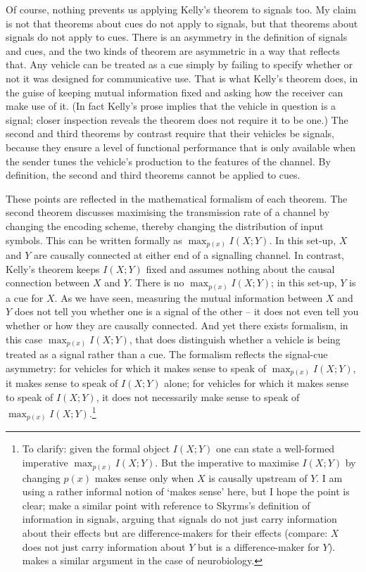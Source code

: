 \documentclass[12pt]{article}
\begin{document}
Of course, nothing prevents us applying Kelly's theorem to signals too.
My claim is not that theorems about cues do not apply to signals, but that theorems about signals do not apply to cues.
There is an asymmetry in the definition of signals and cues, and the two kinds of theorem are asymmetric in a way that reflects that.
Any vehicle can be treated as a cue simply by failing to specify whether or not it was designed for communicative use.
That is what Kelly's theorem does, in the guise of keeping mutual information fixed and asking how the receiver can make use of it.
(In fact Kelly's prose implies that the vehicle in question is a signal; closer inspection reveals the theorem does not require it to be one.)
The second and third theorems by contrast require that their vehicles be signals, because they ensure a level of functional performance that is only available when the sender tunes the vehicle's production to the features of the channel.
By definition, the second and third theorems cannot be applied to cues.

These points are reflected in the mathematical formalism of each theorem.
The second theorem discusses maximising the transmission rate of a channel by changing the encoding scheme, thereby changing the distribution of input symbols.
This can be written formally as $\max_{p(x)}I(X;Y)$.
In this set-up, $X$ and $Y$ are causally connected at either end of a signalling channel.
In contrast, Kelly's theorem keeps $I(X;Y)$ fixed and assumes nothing about the causal connection between $X$ and $Y$.
There is no $\max_{p(x)}I(X;Y)$; in this set-up, $Y$ is a cue for $X$.
As we have seen, measuring the mutual information between $X$ and $Y$ does not tell you whether one is a signal of the other -- it does not even tell you whether or how they are causally connected.
And yet there exists formalism, in this case $\max_{p(x)}I(X;Y)$, that does distinguish whether a vehicle is being treated as a signal rather than a cue.
The formalism reflects the signal-cue asymmetry: for vehicles for which it makes sense to speak of $\max_{p(x)}I(X;Y)$, it makes sense to speak of $I(X;Y)$ alone; for vehicles for which it makes sense to speak of $I(X;Y)$, it does not necessarily make sense to speak of $\max_{p(x)}I(X;Y)$.\footnote{To clarify: given the formal object $I(X;Y)$ one can state a well-formed imperative $\max_{p(x)}I(X;Y)$. But the imperative to maximise $I(X;Y)$ by changing $p(x)$ makes sense only when $X$ is causally upstream of $Y$. I am using a rather informal notion of `makes sense' here, but I hope the point is clear; \citet{calcott2020signals} make a similar point with reference to Skyrms's \citeyearpar{skyrms2010signals} definition of information in signals, arguing that signals do not just carry information about their effects but are difference-makers for their effects (compare: $X$ does not just carry information about $Y$ but is a difference-maker for $Y$). 
\citet{rathkopf2017neural} makes a similar argument in the case of neurobiology.}
\end{document}
